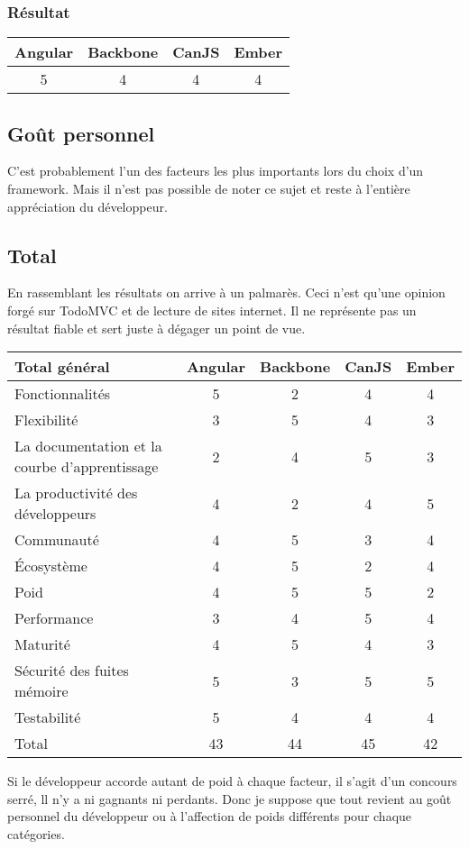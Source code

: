 \subsubsection{Résultat}
\begin{tabular}{|c|c|c|c|}
  \hline 
  Angular & Backbone & CanJS & Ember \\
  \hline 
  5 & 4 & 4 & 4 \\
  \hline
\end{tabular}


\subsection{Goût personnel}

C’est probablement l’un des facteurs les plus importants lors du choix d’un framework.
Mais il n’est pas possible de noter ce sujet et reste à l’entière appréciation du développeur.

\subsection{Total}

En rassemblant les résultats on arrive à un palmarès. Ceci n’est qu’une opinion forgé sur TodoMVC et de lecture de sites internet. Il ne représente pas un résultat fiable et sert juste à dégager un point de vue.


\begin{tabular}{|l|c|c|c|c|}
  \hline 
  Total général & Angular & Backbone & CanJS & Ember \\
  \hline 
  Fonctionnalités & 5 & 2 & 4 & 4 \\
  \hline 
  Flexibilité & 3 & 5 & 4 & 3 \\
  \hline 
  La documentation et la courbe d'apprentissage & 2 & 4 & 5 & 3 \\
  \hline 
  La productivité des développeurs & 4 & 2 & 4 & 5 \\
  \hline 
  Communauté & 4 & 5 & 3 & 4 \\
  \hline 
  Écosystème & 4 & 5 & 2 & 4 \\
  \hline
  Poid & 4 & 5 & 5 & 2 \\
  \hline
  Performance & 3 & 4 & 5 & 4 \\
  \hline
  Maturité & 4 & 5 & 4 & 3 \\
  \hline
  Sécurité des fuites mémoire & 5 & 3 & 5 & 5 \\
  \hline
  Testabilité & 5 & 4 & 4 & 4 \\
  \hline
  Total & 43 & 44 & 45 & 42 \\
  \hline
\end{tabular}

Si le développeur accorde autant de poid à chaque facteur, il s’agit d’un concours serré, ll n’y a ni gagnants ni perdants. Donc je suppose que tout revient au goût personnel du développeur ou à l’affection de poids différents pour chaque catégories.